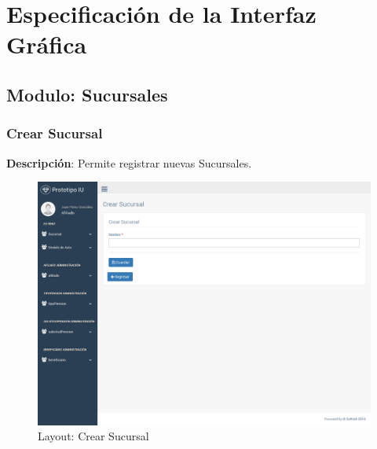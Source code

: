 \documentclass[10pt, letterpaper]{report}
\begin{document}
\chapter{Especificación de la Interfaz Gráfica}

\section{Modulo: Sucursales}

\subsection{Crear Sucursal}
\textbf{Descripción}: Permite registrar nuevas Sucursales.\\
\begin{figure}[h]
	\label{tab:layout-crearsucursalpage}
	\includegraphics[width=\linewidth]{ui-prototype/SucursalServices/CrearSucursalPage.png}
	\caption{Layout: Crear Sucursal}
\end{figure}

\begin{table}[t]
	\caption{Forma: Crear Sucursal}
	\label{tab:campos-crearsucursalpage}
\end{table}
\end{document}
